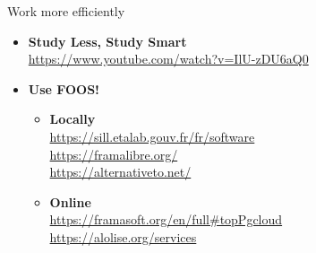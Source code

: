 \documentclass[french,c,
hyperref={%
    pdftitle={Rappels COVID-19},%
    pdfauthor={Guillaume MULLER},%
    pdfsubject={COVID-19},%
    pdfkeywords={COVID-19}%
    colorlinks=true,%
    urlcolor=blue,%
    linkcolor=%
  },%
xcolor={pdftex,svgnames}, %
]{beamer}  %
\begin{document}
\begin{frame}{Work more efficiently}
  \begin{itemize}
    \item \textbf{Study Less, Study Smart} \\
      \url{https://www.youtube.com/watch?v=IlU-zDU6aQ0}
    \bigskip
    \item \textbf{Use FOOS!}
    \begin{itemize}
      \item \textbf{Locally} \\
        \url{https://sill.etalab.gouv.fr/fr/software} \\
        \url{https://framalibre.org/} \\
        \url{https://alternativeto.net/}
      \item \textbf{Online} \\
        \url{https://framasoft.org/en/full\#topPgcloud} \\
        \url{https://alolise.org/services}
    \end{itemize}
  \end{itemize}
\end{frame}
\end{document}
